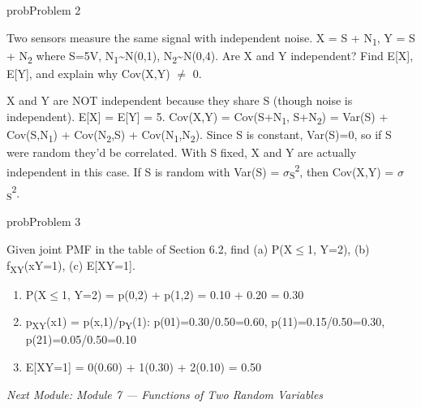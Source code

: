 \begin{PSbox}[unbreakable]{prob}{Problem 2}

Two sensors measure the same signal with independent noise. X = S + N\textsubscript{1}, Y = S + N\textsubscript{2} where S=5V, N\textsubscript{1}\textasciitilde{}N(0,1), N\textsubscript{2}\textasciitilde{}N(0,4). Are X and Y independent? Find E[X], E[Y], and explain why Cov(X,Y) \ensuremath{\neq} 0.

\PSsolution{} X and Y are NOT independent because they share S (though noise is independent). E[X] = E[Y] = 5. Cov(X,Y) = Cov(S+N\textsubscript{1}, S+N\textsubscript{2}) = Var(S) + Cov(S,N\textsubscript{1}) + Cov(N\textsubscript{2},S) + Cov(N\textsubscript{1},N\textsubscript{2}). Since S is constant, Var(S)=0, so if S were random they’d be correlated. With S fixed, X and Y are actually independent in this case. If S is random with Var(S) = \ensuremath{\sigma}\textsubscript{S}\textsuperscript{2}, then Cov(X,Y) = \ensuremath{\sigma}\textsubscript{S}\textsuperscript{2}.

\end{PSbox}

\begin{PSbox}[unbreakable]{prob}{Problem 3}

Given joint PMF in the table of Section 6.2, find (a) P(X\ensuremath{\le}1, Y=2), (b) f\textsubscript{X\textbar{}Y}(x\textbar{}Y=1), (c) E[X\textbar{}Y=1].

\PSsolution{} 

\begin{enumerate}
\def\labelenumi{(\alph{enumi})}
\tightlist
\item
  P(X\ensuremath{\le}1, Y=2) = p(0,2) + p(1,2) = 0.10 + 0.20 = 0.30
\item
  p\textsubscript{X\textbar{}Y}(x\textbar{}1) = p(x,1)/p\textsubscript{Y}(1): p(0\textbar{}1)=0.30/0.50=0.60, p(1\textbar{}1)=0.15/0.50=0.30, p(2\textbar{}1)=0.05/0.50=0.10
\item
  E[X\textbar{}Y=1] = 0(0.60) + 1(0.30) + 2(0.10) = 0.50
\end{enumerate}

\emph{Next Module: {Module 7 — Functions of Two Random Variables}}

\end{PSbox}
